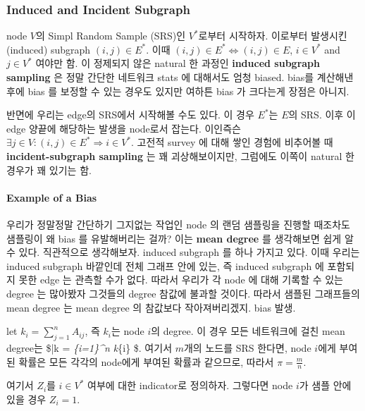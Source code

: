 \documentclass[
]{book}
\begin{document}
{{{\hypertarget{induced-and-incident-subgraph}{%
\subsubsection{Induced and Incident Subgraph}\label{induced-and-incident-subgraph}}

node \(V\)의 Simpl Random Sample (SRS)인 \(V^\ast\)로부터 시작하자. 이로부터 발생시킨 (induced) subgraph \((i, j) \in E^\ast\). 이때 \((i, j) \in E^\ast \Leftrightarrow (i,j) \in E\), \(i \in V^\ast\) and \(j \in V^\ast\) 여야만 함. 이 정제되지 않은 natural 한 과정인 \textbf{induced subgraph sampling} 은 정말 간단한 네트워크 stats 에 대해서도 엄청 biased. bias를 계산해낸 후에 bias 를 보정할 수 있는 경우도 있지만 여하튼 bias 가 크다는게 장점은 아니지.

반면에 우리는 edge의 SRS에서 시작해볼 수도 있다. 이 경우 \(E^\ast\)는 \(E\)의 SRS. 이후 이 edge 양끝에 해당하는 발생을 node로서 잡는다. 이인즉슨 \(\exists j \in V:(i,j) \in E^\ast \Rightarrow i \in V^\ast\). 고전적 survey 에 대해 쌓인 경험에 비추어볼 때 \textbf{incident-subgraph sampling} 는 꽤 괴상해보이지만, 그럼에도 이쪽이 natural 한 경우가 꽤 있기는 함.

\hypertarget{example-of-a-bias}{%
\paragraph{Example of a Bias}\label{example-of-a-bias}}

우리가 정말정말 간단하기 그지없는 작업인 node 의 랜덤 샘플링을 진행할 때조차도 샘플링이 왜 bias 를 유발해버리는 걸까? 이는 \textbf{mean degree} 를 생각해보면 쉽게 알 수 있다. 직관적으로 생각해보자. induced subgraph 를 하나 가지고 있다. 이때 우리는 induced subgraph 바깥인데 전체 그래프 안에 있는, 즉 induced subgraph 에 포함되지 못한 edge 는 관측할 수가 없다. 따라서 우리가 각 node 에 대해 기록할 수 있는 degree 는 많아봤자 그것들의 degree 참값에 불과할 것이다. 따라서 샘플된 그래프들의 mean degree 는 mean degree 의 참값보다 작아져버리겠지. bias 발생.

let \(k_i = \sum_{j=1}^n A_{ij}\), 즉 \(k_i\)는 node \(i\)의 degree. 이 경우 모든 네트워크에 걸친 mean degree는 \$\bar k =  \sum\emph{\{i=1\}\^{}n k}\{i\} \$. 여기서 \(m\)개의 노드를 SRS 한다면, node \(i\)에게 부여된 확률은 모든 각각의 node에게 부여된 확률과 같으므로, 따라서 \(\pi = \frac{m}{n}\).

여기서 \(Z_i\)를 \(i \in V^\ast\) 여부에 대한 indicator로 정의하자. 그렇다면 node \(i\)가 샘플 안에 있을 경우 \(Z_i = 1\).

}}}
\end{document}

